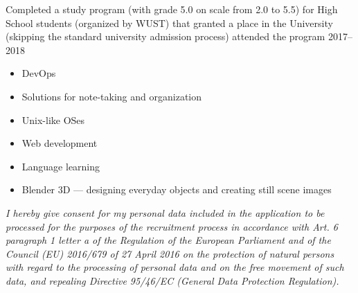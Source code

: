 \documentclass[10pt,a4paper,ragged2e,withhyper]{altacv}
\begin{document}
\begin{paracol}{2}
\divider


\divider

{Completed a study program (with grade 5.0 on scale from 2.0 to 5.5)
for High School students (organized by WUST)
that granted a place in the University
(skipping the standard university admission process)
\newline \smallskip
attended the program 2017–2018}



\begin{itemize}
    \item DevOps
    \item Solutions for note-taking and organization
    \item Unix-like OSes
    \item Web development
    \item Language learning
    \item Blender 3D — designing everyday objects and creating still scene images
\end{itemize}





\divider

\end{paracol}

\smallskip

\small\textit{I hereby give consent for my personal data included in the application to be processed for the purposes of the recruitment process in accordance with Art. 6 paragraph 1 letter a of the Regulation of the European Parliament and of the Council (EU) 2016/679 of 27 April 2016 on the protection of natural persons with regard to the processing of personal data and on the free movement of such data, and repealing Directive 95/46/EC (General Data Protection Regulation).}
\end{document}
